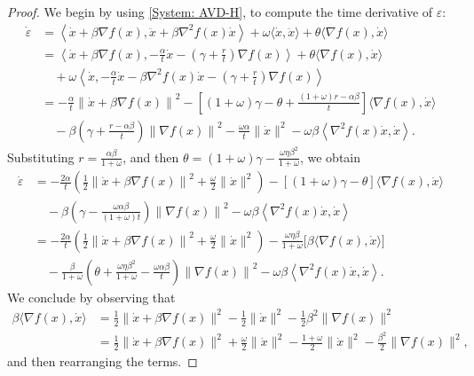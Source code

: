 \documentclass[onefignum,onetabnum]{siamart220329}
\begin{document}
\begin{proof}
We begin by using \eqref{System: AVD-H}, to compute the time derivative of $\varepsilon$:
\begin{align*}
\dot{\varepsilon}
&= \left\langle \dot{x} + \beta\nabla f(x), \ddot{x} + \beta\nabla^2 f(x)\dot{x} \right\rangle + \omega\langle \dot{x}, \ddot{x} \rangle + \theta\langle \nabla f(x), \dot{x} \rangle \\
&= \left\langle \dot{x} + \beta\nabla f(x), -\frac{\alpha}{t}\dot{x} - \left( \gamma + \frac{r}{t} \right)\nabla f(x) \right\rangle
  + \theta\langle \nabla f(x), \dot{x} \rangle \\
&\quad + \omega\left\langle \dot{x}, -\frac{\alpha}{t}\dot{x} - \beta\nabla^2 f(x)\dot{x} - \left( \gamma + \frac{r}{t} \right)\nabla f(x)  \right\rangle \\
&= - \frac{\alpha}{t}\left\| \dot{x} + \beta\nabla f(x) \right\|^2
   - \left[ (1+\omega) \gamma - \theta + \frac{(1+\omega)r-\alpha\beta}{t} \right] \langle \nabla f(x), \dot{x} \rangle \\
&\quad - \beta\left( \gamma + \frac{r-\alpha\beta}{t} \right) \left\| \nabla f(x) \right\|^2 
    - \frac{\omega\alpha}{t}\| \dot{x} \|^2 
    - \omega\beta\left\langle \nabla^2 f(x)\dot{x}, \dot{x} \right\rangle.
\end{align*}
Substituting $r = \frac{\alpha\beta}{1+\omega}$, and then $\theta = (1+\omega) \gamma - \frac{\omega\eta\beta^2}{1+\omega}$, we obtain
\begin{align*} 
\dot{\varepsilon}
&= -\frac{2\alpha}{t} \left( \frac{1}{2}\left\| \dot{x} + \beta\nabla f(x) \right\|^2 + \frac{\omega}{2} \| \dot{x} \|^2 \right)
   -[(1+\omega) \gamma - \theta] \langle \nabla f(x), \dot{x} \rangle \\
&\quad - \beta\left( \gamma - \frac{\omega\alpha\beta}{(1+\omega)t} \right) \left\| \nabla f(x) \right\|^2
   - \omega\beta\left\langle \nabla^2 f(x)\dot{x}, \dot{x} \right\rangle \\
& = -\frac{2\alpha}{t} \left( \frac{1}{2}\left\| \dot{x} + \beta\nabla f(x) \right\|^2 + \frac{\omega}{2} \| \dot{x} \|^2 \right)
   -\frac{\omega\eta\beta}{1+\omega}\Big[\beta \langle \nabla f(x), \dot{x} \rangle\Big] \\
&\quad - \frac{\beta}{1+\omega}\left( \theta + \frac{\omega\eta\beta^2}{1+\omega} - \frac{\omega\alpha\beta}{t} \right) \left\| \nabla f(x) \right\|^2
   - \omega\beta\left\langle \nabla^2 f(x)\dot{x}, \dot{x} \right\rangle.
\end{align*}
We conclude by observing that
\begin{align*}
\beta \langle \nabla f(x), \dot{x} \rangle 
&= \frac{1}{2}\| \dot{x} + \beta\nabla f(x) \|^2
   - \frac{1}{2}\| \dot{x} \|^2
   - \frac{1}{2}\beta^2 \| \nabla f(x) \|^2  \\
&= \frac{1}{2}\| \dot{x} + \beta\nabla f(x) \|^2
   + \frac{\omega}{2}\| \dot{x} \|^2
   - \frac{1+\omega}{2}\| \dot{x} \|^2
   - \frac{\beta^2 }{2}\| \nabla f(x) \|^2,
\end{align*}
and then rearranging the terms.
\end{proof}
\end{document}
